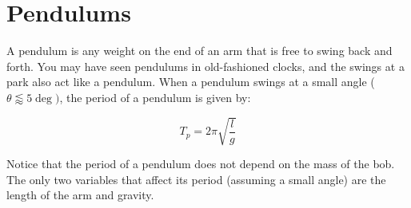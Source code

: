 	\section{Pendulums}
	A pendulum is any weight on the end of an arm that is free to swing back and forth.  You may have seen pendulums in old-fashioned clocks, and the swings at a park also act like a pendulum.  When a pendulum swings at a small angle ($\theta \lessapprox 5 \deg)$, the period of a pendulum is given by:
	
	\begin{mdframed}[backgroundcolor=orange!20!white]
		\begin{equation}
			T_p = 2 \pi \sqrt{\frac{l}{g}}
			\label{eqn:pendulumperiod}
		\end{equation}
	\end{mdframed}
	
	Notice that the period of a pendulum does not depend on the mass of the bob.  The only two variables that affect its period (assuming a small angle) are the length of the arm and gravity.  
	
	
	 
	

		


	


